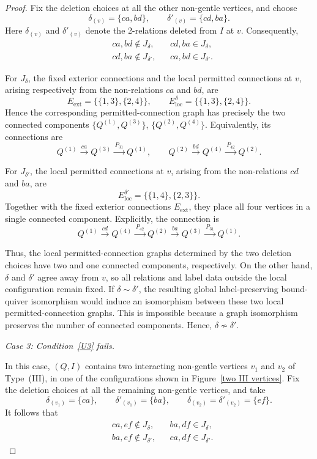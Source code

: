 \documentclass[11pt]{amsart}
\numberwithin{equation}{section}
\theoremstyle{definition}
\begin{document}
\begin{proof}
Fix the deletion choices at all the other non-gentle vertices, and
choose
\[
  \delta_{(v)}=\{ca,bd\},
  \qquad
  \delta'_{(v)}=\{cd,ba\}.
\]
Here \(\delta_{(v)}\) and \(\delta'_{(v)}\) denote the 2-relations deleted from \(I\) at \(v\). Consequently,
\[
\begin{aligned}
  &ca,bd\notin J_{\delta},
  &&cd,ba\in J_{\delta},\\
  &cd,ba\notin J_{\delta'},
  &&ca,bd\in J_{\delta'}.
\end{aligned}
\]

For \(J_{\delta}\), the fixed exterior connections and the local
permitted connections at \(v\), arising respectively from the
non-relations \(ca\) and \(bd\), are
\[
  E_{\mathrm{ext}}=\bigl\{\{1,3\},\{2,4\}\bigr\},
  \qquad
  E_{\mathrm{loc}}^{\delta}
  =\bigl\{\{1,3\},\{2,4\}\bigr\}.
\]
Hence the corresponding permitted-connection graph has precisely the
two connected components
$\bigl\{Q^{(1)},Q^{(3)}\bigr\}$,
$\bigl\{Q^{(2)},Q^{(4)}\bigr\}$.
Equivalently, its connections are
\[
  Q^{(1)}\xrightarrow{\,ca\,}Q^{(3)}
  \xrightarrow{\,P_{31}\,}Q^{(1)},
  \qquad
  Q^{(2)}\xrightarrow{\,bd\,}Q^{(4)}
  \xrightarrow{\,P_{42}\,}Q^{(2)}.
\]

For \(J_{\delta'}\), the local permitted connections at \(v\),
arising from the non-relations \(cd\) and \(ba\), are
\[
  E_{\mathrm{loc}}^{\delta'}
  =\bigl\{\{1,4\},\{2,3\}\bigr\}.
\]
Together with the fixed exterior connections
\(E_{\mathrm{ext}}\), they place all four vertices in a single
connected component. Explicitly, the connection is
\[
  Q^{(1)}\xrightarrow{\,cd\,}Q^{(4)}
  \xrightarrow{\,P_{42}\,}Q^{(2)}
  \xrightarrow{\,ba\,}Q^{(3)}
  \xrightarrow{\,P_{31}\,}Q^{(1)}.
\]

Thus, the local permitted-connection graphs determined by the two
deletion choices have two and one connected components,
respectively. On the other hand, \(\delta\) and \(\delta'\) agree
away from \(v\), so all relations and label data outside the local
configuration remain fixed. If \(\delta\sim\delta'\), the resulting
global label-preserving bound-quiver isomorphism would induce an
isomorphism between these two local permitted-connection graphs.
This is impossible because a graph isomorphism preserves the number
of connected components. Hence, $\delta\not\sim\delta'$.

\smallskip
\noindent
\emph{Case 3: Condition~\ref{U3} fails.}

In this case, \((Q,I)\) contains two interacting non-gentle vertices
\(v_1\) and \(v_2\) of Type~\textup{(III)}, in one of the
configurations shown in Figure~\ref{two III vertices}. Fix the
deletion choices at all the remaining non-gentle vertices, and take
\[
  \delta_{(v_1)}=\{ca\},
  \qquad
  \delta'_{(v_1)}=\{ba\},
  \qquad
  \delta_{(v_2)}=\delta'_{(v_2)}=\{ef\}.
\]
It follows that
\[
\begin{aligned}
  &ca,ef\notin J_{\delta},
  &&ba,df\in J_{\delta},\\
  &ba,ef\notin J_{\delta'},
  &&ca,df\in J_{\delta'}.
\end{aligned}
\]


\end{proof}
\end{document}
